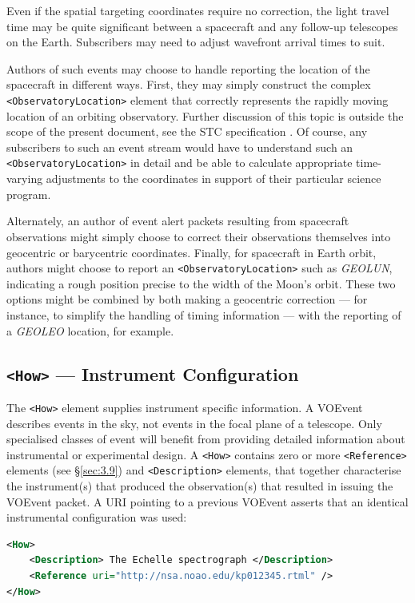 \documentclass[11pt,a4paper]{ivoa}
\begin{document}
Even if the spatial targeting coordinates require no correction, the light 
travel time may be quite significant between a spacecraft and any follow-up 
telescopes on the Earth. Subscribers may need to adjust wavefront arrival times 
to suit. 

Authors of such events may choose to handle reporting the location of the 
spacecraft in different ways. First, they may simply construct the complex {\tt 
<ObservatoryLocation>} element that correctly represents the rapidly moving 
location of an orbiting observatory. Further discussion of this topic is outside 
the scope of the present document, see the STC specification 
\citep{2007ivoa.spec.1030R}. Of course, any subscribers to such an event stream 
would have to understand such an {\tt <ObservatoryLocation>} in detail and be 
able to calculate appropriate time-varying adjustments to the coordinates in 
support of their particular science program. 

Alternately, an author of event alert packets resulting from spacecraft 
observations might simply choose to correct their observations themselves into 
geocentric or barycentric coordinates. Finally, for spacecraft in Earth orbit, 
authors might choose to report an {\tt <ObservatoryLocation>} such as 
\emph{GEOLUN}, indicating a rough position precise to the width of the Moon's 
orbit. These two options might be combined by both making a geocentric 
correction --- for instance, to simplify the handling of timing information --- 
with the reporting of a \emph{GEOLEO} location, for example. 

\subsection{{\tt <How>} --- Instrument Configuration}
\label{sec:3.5}
The {\tt <How>} element supplies instrument specific information. A VOEvent 
describes events in the sky, not events in the focal plane of a telescope. Only 
specialised classes of event will benefit from providing detailed information 
about instrumental or experimental design. A {\tt <How>} contains zero or more 
{\tt <Reference>} elements (see \S\ref{sec:3.9}) and {\tt <Description>} 
elements, that together characterise the instrument(s) that produced the 
observation(s) that resulted in issuing the VOEvent packet. A URI pointing to a 
previous VOEvent asserts that an identical instrumental configuration was used: 
\begin{lstlisting}[language=XML]
<How>
    <Description> The Echelle spectrograph </Description>
    <Reference uri="http://nsa.noao.edu/kp012345.rtml" />
</How> 
\end{lstlisting}
\end{document}
